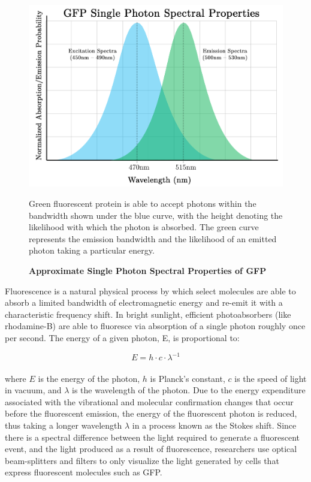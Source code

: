 \documentclass [PhD] {UCLAthesis}
\begin{document}
\begin{figure}
\centering
\includegraphics[width=0.9\linewidth]{Figures/GFP.PNG}
\caption{\textbf{Approximate Single Photon Spectral Properties of GFP}}
\raggedright
Green fluorescent protein is able to accept photons within the bandwidth shown under the blue curve, with the height denoting the likelihood with which the photon is absorbed. The green curve represents the emission bandwidth and the likelihood of an emitted photon taking a particular energy.
\label{fig:ultrafast}
\end{figure}

Fluorescence is a natural physical process by which select molecules are able to absorb a limited bandwidth of electromagnetic energy and re-emit it with a characteristic frequency shift. In bright sunlight, efficient photoabsorbers (like rhodamine-B) are able to fluoresce via absorption of a single photon roughly once per second. The energy of a given photon, E, is proportional to:

\begin{equation}
    E = h \cdot c \cdot \lambda^{-1}
\end{equation}
\\
where $E$ is the energy of the photon, $h$ is Planck's constant, $c$ is the speed of light in vacuum, and $\lambda$ is the wavelength of the photon. Due to the energy expenditure associated with the vibrational and molecular confirmation changes that occur before the fluorescent emission, the energy of the fluorescent photon is reduced, thus taking a longer wavelength $\lambda$ in a process known as the Stokes shift. Since there is a spectral difference between the light required to generate a fluorescent event, and the light produced as a result of fluorescence, researchers use optical beam-splitters and filters to only visualize the light generated by cells that express fluorescent molecules such as GFP. 
\end{document}
